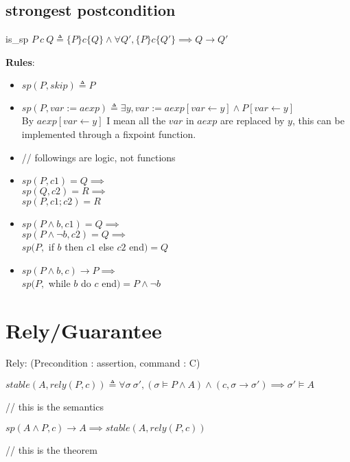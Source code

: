 \documentclass[12pt, fleqn]{article}
\begin{document}
\subsection{strongest postcondition}

is\_sp $P \ c \ Q \triangleq \{P\} c \{Q\} \land \forall Q', \{P\} c \{Q'\} \implies Q \rightarrow Q'$

\bigskip

\textbf{Rules}:
\begin{itemize}
\item %
  $sp(P, skip) \triangleq P$

\item %
  $sp(P, var := aexp) \triangleq \exists y, var := aexp[var \leftarrow y] \land P[var \leftarrow y]$\\
  By $aexp[var \leftarrow y]$ I mean all the $var$ in $aexp$ are replaced by $y$, this can be implemented through a fixpoint function.

\item[]
  // followings are logic, not functions

\item %
  $sp(P, c1) = Q \implies$\\
  $sp(Q, c2) = R \implies$\\
  $sp(P, c1; c2) = R$

\item %
  $sp(P \land b, c1) = Q \implies$\\
  $sp(P \land \lnot b, c2) = Q \implies$\\
  $sp(P,$ if $b$ then $c1$ else $c2$ end$) = Q$

\item %
  $sp(P \land b, c) \rightarrow P \implies$\\
  $sp(P,$ while $b$ do $c$ end$) = P \land \lnot b$

\end{itemize}



\section{Rely/Guarantee}

Rely: (Precondition : assertion, command : C)

\bigskip

$stable(A, rely(P, c)) \triangleq \forall \sigma \ \sigma', (\sigma \models P \land A) \land (c, \sigma \rightarrow \sigma') \implies \sigma' \models A$

// this is the semantics

\bigskip

$sp(A \land P, c) \rightarrow A \implies stable(A, rely(P, c))$

// this is the theorem

\end{document}
